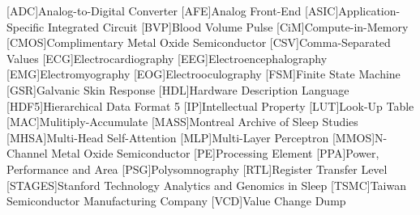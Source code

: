 \begin{acronym}
    {\small{}
    [ADC]{Analog-to-Digital Converter}
    [AFE]{Analog Front-End}
    [ASIC]{Application-Specific Integrated Circuit}
    [BVP]{Blood Volume Pulse}
    [CiM]{Compute-in-Memory}
    [CMOS]{Complimentary Metal Oxide Semiconductor}
    [CSV]{Comma-Separated Values}
    [ECG]{Electrocardiography}
    [EEG]{Electroencephalography}
    [EMG]{Electromyography}
    [EOG]{Electrooculography}
    [FSM]{Finite State Machine}
    [GSR]{Galvanic Skin Response}
    [HDL]{Hardware Description Language}
    [HDF5]{Hierarchical Data Format 5}
    [IP]{Intellectual Property}
    [LUT]{Look-Up Table}
    [MAC]{Mulitiply-Accumulate}
    [MASS]{Montreal Archive of Sleep Studies}
    [MHSA]{Multi-Head Self-Attention}
    [MLP]{Multi-Layer Perceptron}
    [MMOS]{N-Channel Metal Oxide Semiconductor}
    [PE]{Processing Element}
    [PPA]{Power, Performance and Area}
    [PSG]{Polysomnography}
    [RTL]{Register Transfer Level}
    [STAGES]{Stanford Technology Analytics and Genomics in Sleep}
    [TSMC]{Taiwan Semiconductor Manufacturing Company}
    [VCD]{Value Change Dump}
    }
\end{acronym}